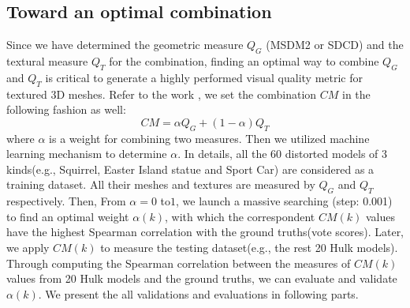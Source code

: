 \subsection{Toward an optimal combination}
Since we have determined the geometric measure $Q_G$ (MSDM2 or SDCD) and the textural measure $Q_T$ for the combination, finding an optimal way to combine $Q_G$ and $Q_T$ is critical to generate a highly performed visual quality metric for textured 3D meshes. Refer to the work \cite{Tian_2004} , we set the combination $CM$ in the following fashion as well:
\begin{equation}
CM = \alpha Q_G +(1-\alpha) Q_T
\end{equation}
where $\alpha$ is a weight for combining two measures. Then we utilized machine learning mechanism to determine $\alpha$. In details,  all the 60 distorted models of 3 kinds(e.g., Squirrel, Easter Island statue and Sport Car) are considered as a training dataset. All their meshes and textures are measured by $Q_G$ and $Q_T$ respectively. Then, From $\alpha =0$ to$1$, we launch a massive searching (step: 0.001) to find an optimal weight $\alpha(k)$, with which the correspondent $CM(k)$ values have the highest Spearman correlation with the ground truths(vote scores). Later, we apply $CM(k)$ to measure the testing dataset(e.g., the rest 20 Hulk models). Through computing the Spearman correlation between the measures of $CM(k)$ values from 20 Hulk models and the ground truths, we can evaluate and validate $\alpha(k)$. We present the all validations and evaluations in following parts.\\
